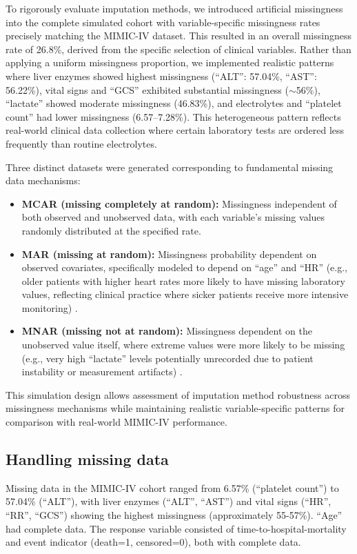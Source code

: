 \documentclass[pdflatex,sn-mathphys-num]{sn-jnl}%
\theoremstyle{thmstyleone}%
\theoremstyle{thmstyletwo}%
\theoremstyle{thmstylethree}%
\begin{document}
To rigorously evaluate imputation methods, we introduced artificial missingness into the complete simulated cohort with variable-specific missingness rates precisely matching the MIMIC-IV dataset. This resulted in an overall missingness rate of 26.8\%, derived from the specific selection of clinical variables. Rather than applying a uniform missingness proportion, we implemented realistic patterns where liver enzymes showed highest missingness (``ALT'': 57.04\%, ``AST'': 56.22\%), vital signs and ``GCS'' exhibited substantial missingness ($\sim$56\%), ``lactate'' showed moderate missingness (46.83\%), and electrolytes and ``platelet count'' had lower missingness (6.57--7.28\%). This heterogeneous pattern reflects real-world clinical data collection where certain laboratory tests are ordered less frequently than routine electrolytes.

Three distinct datasets were generated corresponding to fundamental missing data mechanisms:

\begin{itemize}
	\item \textbf{MCAR (missing completely at random):} Missingness independent of both observed and unobserved data, with each variable's missing values randomly distributed at the specified rate.
	\item \textbf{MAR (missing at random):} Missingness probability dependent on observed covariates, specifically modeled to depend on ``age'' and ``HR'' (e.g., older patients with higher heart rates more likely to have missing laboratory values, reflecting clinical practice where sicker patients receive more intensive monitoring) \cite{rubin1976inference}.
	\item \textbf{MNAR (missing not at random):} Missingness dependent on the unobserved value itself, where extreme values were more likely to be missing (e.g., very high ``lactate'' levels potentially unrecorded due to patient instability or measurement artifacts) \cite{rubin1976inference}.
\end{itemize}

This simulation design allows assessment of imputation method robustness across missingness mechanisms while maintaining realistic variable-specific patterns for comparison with real-world MIMIC-IV performance.


\subsection{Handling missing data}
Missing data in the MIMIC-IV cohort ranged from 6.57\% (``platelet count'') to 57.04\% (``ALT''), with liver enzymes (``ALT'', ``AST'') and vital signs (``HR'', ``RR'', ``GCS'') showing the highest missingness (approximately 55-57\%). ``Age'' had complete data. The response variable consisted of time-to-hospital-mortality and event indicator (death=1, censored=0), both with complete data.
\end{document}
